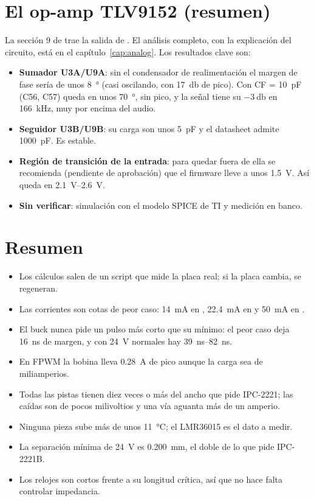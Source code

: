 \section{El op-amp TLV9152 (resumen)}\label{sec:c10-tlv}

La sección 9 de  trae la salida de . El análisis completo, con
la explicación del circuito, está en el capítulo~\ref{cap:analog}. Los resultados clave son:

\begin{itemize}
  \item \textbf{Sumador U3A/U9A}: sin el condensador de realimentación el margen de fase sería de unos
  \SI{8}{\degree} (casi oscilando, con \SI{17}{\decibel} de pico). Con CF = \SI{10}{\pico\farad} (C56, C57) queda en
  unos \SI{70}{\degree}, sin pico, y la señal tiene su $-\SI{3}{\decibel}$ en \SI{166}{\kilo\hertz}, muy por encima
  del audio.
  \item \textbf{Seguidor U3B/U9B}: su carga son unos \SI{5}{\pico\farad} y el datasheet 
  admite \SI{1000}{\pico\farad}. Es estable.
  \item \textbf{Región de transición de la entrada}: para quedar fuera de ella se recomienda (pendiente de aprobación)
  que el firmware lleve  a unos \SI{1.5}{\volt}. Así  queda en \SIrange{2.1}{2.6}{\volt}.
  \item \textbf{Sin verificar}: simulación con el modelo SPICE de TI y medición en banco.
\end{itemize}

\section*{Resumen}
\begin{itemize}
  \item Los cálculos salen de un script que mide la placa real; si la placa cambia, se regeneran.
  \item Las corrientes son cotas de peor caso: \SI{14}{\milli\ampere} en , \SI{22.4}{\milli\ampere} en
   y \SI{50}{\milli\ampere} en .
  \item El buck nunca pide un pulso más corto que su mínimo: el peor caso deja \SI{16}{\nano\second} de margen, y con
  \SI{24}{\volt} normales hay \SIrange{39}{82}{\nano\second}.
  \item En FPWM la bobina lleva \SI{0.28}{\ampere} de pico aunque la carga sea de miliamperios.
  \item Todas las pistas tienen diez veces o más del ancho que pide IPC-2221; las caídas son de pocos milivoltios y una
  vía aguanta más de un amperio.
  \item Ninguna pieza sube más de unos \SI{11}{\degreeCelsius}; el LMR36015 es el dato a medir.
  \item La separación mínima de \SI{24}{\volt} es \SI{0.200}{\milli\meter}, el doble de lo que pide IPC-2221B.
  \item Los relojes son cortos frente a su longitud crítica, así que no hace falta controlar impedancia.
\end{itemize}
